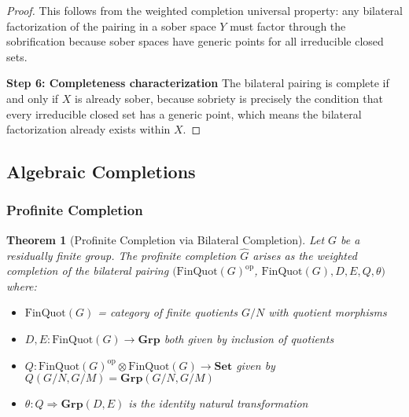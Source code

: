 \documentclass[11pt]{article}
\theoremstyle{plain}
\newtheorem{theorem}{Theorem}[section]
\theoremstyle{definition}
\theoremstyle{remark}
\newcommand{\op}{\mathrm{op}}
\begin{document}
\begin{proof}
This follows from the weighted completion universal property: any bilateral factorization of the pairing in a sober space $Y$ must factor through the sobrification because sober spaces have generic points for all irreducible closed sets.

\textbf{Step 6: Completeness characterization}
The bilateral pairing is complete if and only if $X$ is already sober, because sobriety is precisely the condition that every irreducible closed set has a generic point, which means the bilateral factorization already exists within $X$.
\end{proof}

\subsection{Algebraic Completions}

\subsubsection{Profinite Completion}

\begin{theorem}[Profinite Completion via Bilateral Completion]\label{thm:profinite-bilateral}
Let $G$ be a residually finite group. The profinite completion $\widehat{G}$ arises as the weighted completion of the bilateral pairing $(\mathrm{FinQuot}(G)^{\op}$, $\mathrm{FinQuot}(G), D, E, Q, \theta)$ where:
\begin{itemize}
\item $\mathrm{FinQuot}(G)$ = category of finite quotients $G/N$ with quotient morphisms
\item $D, E : \mathrm{FinQuot}(G) \to \mathbf{Grp}$ both given by inclusion of quotients
\item $Q : \mathrm{FinQuot}(G)^{\op} \otimes \mathrm{FinQuot}(G) \to \mathbf{Set}$ given by $Q(G/N, G/M) = \mathbf{Grp}(G/N, G/M)$
\item $\theta : Q \Rightarrow \mathbf{Grp}(D, E)$ is the identity natural transformation
\end{itemize}
\end{theorem}
\end{document}
